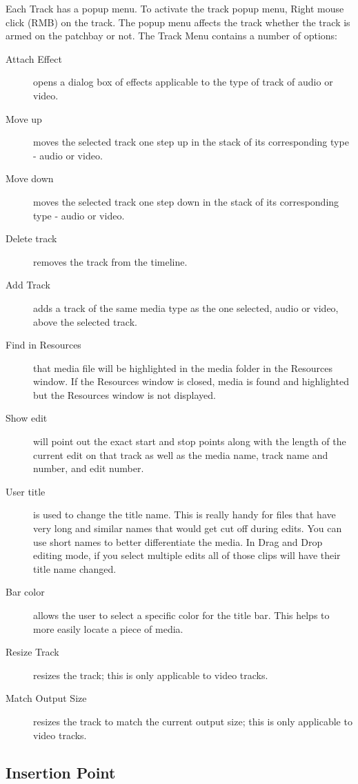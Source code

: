 Each Track has a popup menu. 
To activate the track popup menu, Right mouse click (RMB) on the track. 
The popup menu affects the track whether the track is armed on the patchbay or not. 
The Track Menu contains a number of options:

\begin{description}
    \item[Attach Effect] opens a dialog box of effects applicable to the type of track of audio or video.
    \item[Move up] moves the selected track one step up in the stack of its corresponding type - audio or video.
    \item[Move down]  moves the selected track one step down in the stack of its corresponding type - audio or video.
    \item[Delete track]  removes the track from the timeline.
    \item[Add Track]  adds a track of the same media type as the one selected, audio or video, above the selected track.
    \item[Find in Resources]  that media file will be highlighted in the media folder in the Resources window. If the 
	Resources window is closed, media is found and highlighted but the Resources window is not displayed.
    \item[Show edit]  will point out the exact start and stop points along with the length of the current edit on
        that track as well as the media name, track name and number, and edit number.
    \item[User title]  is used to change the title name.  This is really handy for files that have very long and
        similar names that would get cut off during edits.  You can use short names to better differentiate the
        media. In Drag and Drop editing mode, if you select multiple edits all of those clips will have
their title name changed.
    \item[Bar color]  allows the user to select a specific color for the title bar.  This helps to more easily locate a piece of media.
    \item[Resize Track]  resizes the track; this is only applicable to video tracks.
    \item[Match Output Size]  resizes the track to match the current output size; this is only applicable to video tracks.
\end{description}


\subsection{Insertion Point}%
\label{sub:insertion_point}

